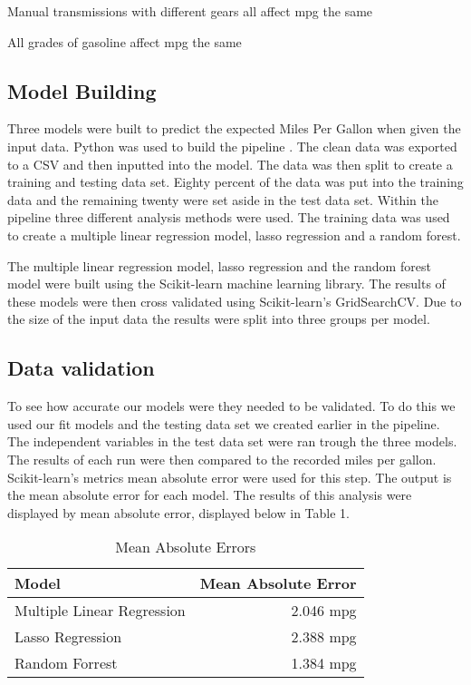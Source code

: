\documentclass[runningheads]{llncs}
\begin{document}
Manual transmissions with different gears all affect mpg the same

All grades of gasoline affect mpg the same

\subsection{Model Building}
Three models were built to predict the expected Miles Per Gallon when given the input data. Python was used to build the pipeline \cite{github}. The clean data was exported to a CSV and then inputted into the model. The data was then split to create a training and testing data set. Eighty percent of the data was put into the training data and the remaining twenty were set aside in the test data set. Within the pipeline three different analysis methods were used. The training data was used to create a multiple linear regression model, lasso regression and a random forest.


The multiple linear regression model, lasso regression and the random forest model were built using the Scikit-learn machine learning library\cite{scikit}. The results of these models were then cross validated using Scikit-learn's GridSearchCV\cite{gridsearch}. Due to the size of the input data the results were split into three groups per model.

\subsection{Data validation}
To see how accurate our models were they needed to be validated. To do this we used our fit models and the testing data set we created earlier in the pipeline. The independent variables in the test data set were ran trough the three models. The results of each run were then compared to the recorded miles per gallon. Scikit-learn's metrics mean absolute error were used for this step. The output is the mean absolute error for each model. The results of this analysis were displayed by mean absolute error, displayed below in Table 1.

\begin{table}
\centering
\caption{Mean Absolute Errors}\label{MAE}
\begin{tabular}{|l|r|}
\hline
Model &  Mean Absolute Error \\
\hline
Multiple Linear Regression &  2.046 mpg \\
Lasso Regression &  2.388 mpg \\
Random Forrest &  1.384 mpg \\

\hline
\end{tabular}
\end{table}
\end{document}
